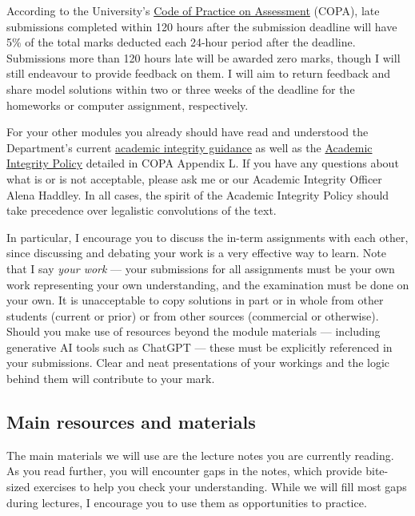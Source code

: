 According to the University's \href{https://www.liverpool.ac.uk/media/livacuk/tqsd/code-of-practice-on-assessment/code_of_practice_on_assessment.pdf}{Code of Practice on Assessment} (COPA), late submissions completed within 120 hours after the submission deadline will have 5\% of the total marks deducted each 24-hour period after the deadline. %
Submissions more than 120 hours late will be awarded zero marks, though I will still endeavour to provide feedback on them.
I will aim to return feedback and share model solutions within two or three weeks of the deadline for the homeworks or computer assignment, respectively.

For your other modules you already should have read and understood the Department's current \href{https://canvas.liverpool.ac.uk/courses/76365/files/11992667}{academic integrity guidance} as well as the \href{https://www.liverpool.ac.uk/media/livacuk/tqsd/code-of-practice-on-assessment/appendix_L_cop_assess.pdf}{Academic Integrity Policy} detailed in COPA Appendix L.
If you have any questions about what is or is not acceptable, please ask me or our Academic Integrity Officer Alena Haddley.
In all cases, the spirit of the Academic Integrity Policy should take precedence over legalistic convolutions of the text.

In particular, I encourage you to discuss the in-term assignments with each other, since discussing and debating your work is a very effective way to learn.
Note that I say \textit{your work} --- your submissions for all assignments must be your own work representing your own understanding, and the examination must be done on your own.
It is unacceptable to copy solutions in part or in whole from other students (current or prior) or from other sources (commercial or otherwise).
Should you make use of resources beyond the module materials --- including generative AI tools such as ChatGPT --- these must be explicitly referenced in your submissions.
Clear and neat presentations of your workings and the logic behind them will contribute to your mark.



\subsection*{Main resources and materials}
The main materials we will use are the lecture notes you are currently reading.
As you read further, you will encounter gaps in the notes, which provide bite-sized exercises to help you check your understanding.
While we will fill most gaps during lectures, I encourage you to use them as opportunities to practice.

